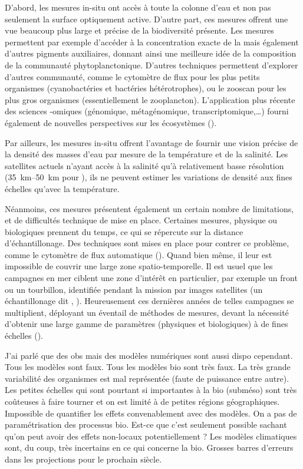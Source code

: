 D'abord, les mesures in-situ ont accès à toute la colonne d'eau et non pas seulement la surface optiquement active.
D'autre part, ces mesures offrent une vue beaucoup plus large et précise de la biodiversité présente.
Les mesures  permettent par exemple d'accéder à la concentration exacte de la  mais également d'autres pigments auxiliaires, donnant ainsi une meilleure idée de la composition de la communauté phytoplanctonique.
D'autres techniques permettent d'explorer d'autres communauté, comme le cytomètre de flux pour les plus petits organismes (cyanobactéries et bactéries hétérotrophes), ou le zooscan pour les plus gros organismes (essentiellement le zooplancton).
L'application plus récente des sciences -omiques (génomique, métagénomique, transcriptomique,\dots) fourni également de nouvelles perspectives sur les écosystèmes (\cite{bork_2015,richter_2019,sunagawa_2020}).

Par ailleurs, les mesures in-situ offrent l'avantage de fournir une vision précise de la densité des masses d'eau par mesure de la température et de la salinité.
Les satellites actuels n'ayant accès à la salinité qu'à relativement basse résolution (\qtyrange{35}{50}{\km} pour  ), ils ne peuvent estimer les variations de densité aux fines échelles qu'avec la température.

Néanmoins, ces mesures présentent également un certain nombre de limitations, et de difficultés technique de mise en place.
Certaines mesures, physique ou biologiques  prennent du temps, ce qui se répercute sur la distance d'échantillonage.
Des techniques sont mises en place pour contrer ce problème, comme le cytomètre de flux automatique (\cite{thyssen_2015}).
Quand bien même, il leur est impossible de couvrir une large zone spatio-temporelle.
Il est usuel que les campagnes en mer ciblent une zone d'intérêt en particulier, par exemple un front ou un tourbillon, identifiée pendant la mission par images satellites (un échantillonage dit , \cite{marrec_2018,tzortzis_2021}).
Heureusement ces dernières années de telles campagnes se multiplient, déployant un éventail de méthodes de mesures, devant la nécessité d'obtenir une large gamme de paramètres (physiques et biologiques) à de fines échelles (\cite{shulman_2015,barcelo-llull_2021,marrec_2018,freilich_2021,tzortzis_2021,wilson_2021}).

J'ai parlé que des obs mais des modèles numériques sont aussi dispo cependant.
Tous les modèles sont faux. Tous les modèles bio sont très faux.
La très grande variabilité des organismes est mal représentée (faute de puissance entre autre). Les petites échelles qui sont pourtant si importantes à la bio (subméso) sont très coûteuses à faire tourner et on est limité à de petites régions géographiques. Impossible de quantifier les effets convenablement avec des modèles.
On a pas de paramétrisation des processus bio. Est-ce que c'est seulement possible sachant qu'on peut avoir des effets non-locaux potentiellement ?
Les modèles climatiques sont, du coup, très incertains en ce qui concerne la bio.
Grosses barres d'erreurs dans les projections pour le prochain siècle.

